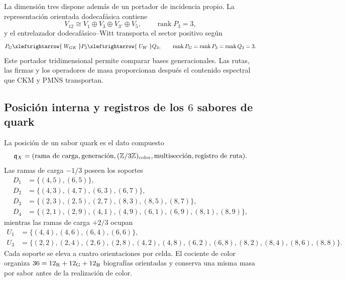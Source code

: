 La dimensión tres dispone además de un portador de incidencia propio. La
representación orientada dodecafásica contiene
\begin{equation}
 V_{12}\cong V_1\oplus V_3\oplus V_{3'}\oplus V_5,
 \qquad \operatorname{rank}P_3=3,
 \label{eq:descomposicion-rango-tres-generaciones-rev2}
\end{equation}
y el entrelazador dodecafásico--Witt transporta el sector positivo según
\begin{equation}
 P_G\xleftrightarrow{\;W_{GK}\;}P_3
 \xleftrightarrow{\;U_W\;}Q_3,
 \qquad
 \operatorname{rank}P_G=\operatorname{rank}P_3
 =\operatorname{rank}Q_3=3.
 \label{eq:transporte-rango-tres-generaciones-rev2}
\end{equation}
Este portador tridimensional permite comparar bases generacionales. Las
rutas, las firmas y los operadores de masa proporcionan después el contenido
espectral que CKM y PMNS transportan.

\subsection{Posición interna y registros de los \(6\) sabores de quark}

La posición de un sabor quark es el dato compuesto
\begin{equation}
 \mathfrak q_X=
 (\text{rama de carga},\text{generación},(\mathbb Z/3\mathbb Z)_{\rm color},
  \text{multisección},\text{registro de ruta}).
 \label{eq:posicion-quark-compuesta-rev2}
\end{equation}
Las ramas de carga \(-1/3\) poseen los soportes
\begin{align}
 D_1&=\{(4,5),(6,5)\},\nonumber\\
 D_2&=\{(4,3),(4,7),(6,3),(6,7)\},\nonumber\\
 D_3&=\{(2,3),(2,5),(2,7),(8,3),(8,5),(8,7)\},\nonumber\\
 D_4&=\{(2,1),(2,9),(4,1),(4,9),(6,1),(6,9),(8,1),(8,9)\},
 \label{eq:soportes-quark-down-rev2}
\end{align}
mientras las ramas de carga \(+2/3\) ocupan
\begin{align}
 U_1&=\{(4,4),(4,6),(6,4),(6,6)\},\nonumber\\
 U_3&=\{(2,2),(2,4),(2,6),(2,8),(4,2),(4,8),
       (6,2),(6,8),(8,2),(8,4),(8,6),(8,8)\}.
 \label{eq:soportes-quark-up-rev2}
\end{align}
Cada soporte se eleva a cuatro orientaciones por celda. El cociente de color
organiza \(36=12_{\rm R}+12_{\rm G}+12_{\rm B}\) biografías orientadas y conserva una misma
masa por sabor antes de la realización de color.

